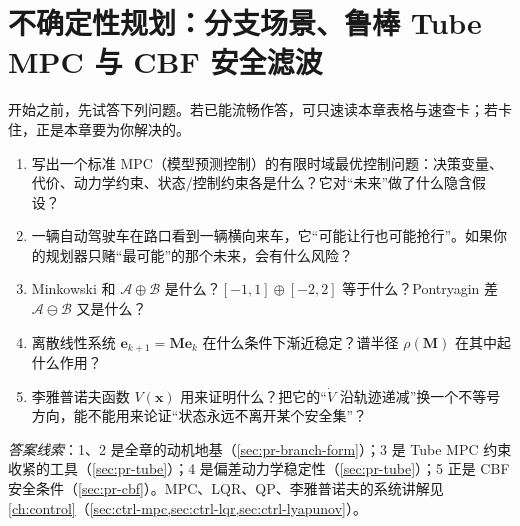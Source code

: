 \chapter{不确定性规划：分支场景、鲁棒 Tube MPC 与 CBF 安全滤波}
\label{ch:plan-robust}


\begin{practice}[前置自测]
开始之前，先试答下列问题。若已能流畅作答，可只速读本章表格与速查卡；若卡住，正是本章要为你解决的。
\begin{enumerate}
  \item 写出一个标准 MPC（模型预测控制）的有限时域最优控制问题：决策变量、代价、动力学约束、状态/控制约束各是什么？它对“未来”做了什么隐含假设？
  \item 一辆自动驾驶车在路口看到一辆横向来车，它“可能让行也可能抢行”。如果你的规划器只赌“最可能”的那个未来，会有什么风险？
  \item Minkowski 和 $\mathcal{A}\oplus\mathcal{B}$ 是什么？$[-1,1]\oplus[-2,2]$ 等于什么？Pontryagin 差 $\mathcal{A}\ominus\mathcal{B}$ 又是什么？
  \item 离散线性系统 $\mathbf{e}_{k+1}=\mathbf{M}\mathbf{e}_k$ 在什么条件下渐近稳定？谱半径 $\rho(\mathbf{M})$ 在其中起什么作用？
  \item 李雅普诺夫函数 $V(\mathbf{x})$ 用来证明什么？把它的“$\dot V$ 沿轨迹递减”换一个不等号方向，能不能用来论证“状态永远不离开某个安全集”？
\end{enumerate}
\noindent\emph{答案线索}：1、2 是全章的动机地基（\cref{sec:pr-branch-form}）；3 是 Tube MPC 约束收紧的工具（\cref{sec:pr-tube}）；4 是偏差动力学稳定性（\cref{sec:pr-tube}）；5 正是 CBF 安全条件（\cref{sec:pr-cbf}）。MPC、LQR、QP、李雅普诺夫的系统讲解见 \cref{ch:control}（\cref{sec:ctrl-mpc,sec:ctrl-lqr,sec:ctrl-lyapunov}）。
\end{practice}


